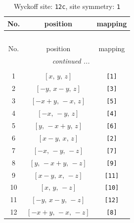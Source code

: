 \documentclass[fleqn,8pt]{jsarticle}
\begin{document}
\begin{longtable}{ccc}
\caption{Wyckoff site: {\tt 12c}, site symmetry: {\tt 1}}
 \\
 \hline \hline
No. & position & mapping \\ \hline \endfirsthead

\multicolumn{2}{l}{\tablename\ \thetable{}} \\
 \hline \hline
No. & position & mapping \\ \hline \endhead

 \hline \hline
\multicolumn{2}{r}{\footnotesize\it continued ...} \\ \endfoot

 \hline \hline
\multicolumn{2}{r}{} \\ \endlastfoot

1 & $\left[ x,\, y,\, z \right]$ & {\tt [1]} \\ \hline
2 & $\left[ - y,\, x - y,\, z \right]$ & {\tt [3]} \\ \hline
3 & $\left[ - x + y,\, - x,\, z \right]$ & {\tt [5]} \\ \hline
4 & $\left[ - x,\, - y,\, z \right]$ & {\tt [4]} \\ \hline
5 & $\left[ y,\, - x + y,\, z \right]$ & {\tt [6]} \\ \hline
6 & $\left[ x - y,\, x,\, z \right]$ & {\tt [2]} \\ \hline
7 & $\left[ - x,\, - y,\, - z \right]$ & {\tt [7]} \\ \hline
8 & $\left[ y,\, - x + y,\, - z \right]$ & {\tt [9]} \\ \hline
9 & $\left[ x - y,\, x,\, - z \right]$ & {\tt [11]} \\ \hline
10 & $\left[ x,\, y,\, - z \right]$ & {\tt [10]} \\ \hline
11 & $\left[ - y,\, x - y,\, - z \right]$ & {\tt [12]} \\ \hline
12 & $\left[ - x + y,\, - x,\, - z \right]$ & {\tt [8]} \\
\end{longtable}
\end{document}
